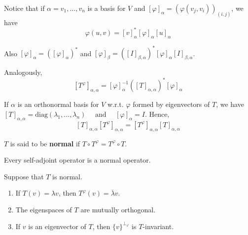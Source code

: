 Notice that if $\alpha = v_1, \ldots, v_n$ is a basis for $V$ and $[\varphi]_\alpha = (\varphi(v_j, v_i))_{(i,j)}$, we have 
\[
	\varphi(u,v) = [v]_\alpha^\ast [\varphi]_\alpha [u]_\alpha 
\]

Also $[\varphi]_\alpha = ([\varphi]_\alpha)^\ast$ and $[\varphi]_\beta = ([I]_{\beta, \alpha})^\ast [\varphi]_\alpha [I]_{\beta, \alpha}$.

Analogously,
\[ [T^\varphi]_{\alpha, \alpha} = [\varphi]_\alpha^{-1} ([T]_{\alpha, \alpha})^\ast [\varphi]_\alpha \]

If $\alpha$ is an orthonormal basis for $V$ w.r.t. $\varphi$ formed by eigenvectors of $T$, we have $[T]_{\alpha, \alpha} = \text{diag}(\lambda_1, \ldots, \lambda_n) \quad \text{ and } \quad [\varphi]_\alpha = I$. Hence, 
\[
  [T]_{\alpha, \alpha} [T^\varphi]_{\alpha, \alpha} = [T^\varphi]_{\alpha, \alpha} [T]_{\alpha, \alpha}
\]

\begin{definition}
  $T$ is said to be \textbf{normal} if $T \circ T^\varphi = T^\varphi \circ T$.
\end{definition}

Every self-adjoint operator is a normal operator. 

\begin{lemma}\label{lm:202301051341}
  Suppose that $T$ is normal.
  \begin{enumerate}
    \item If $T(v) = \lambda v$, then $T^\varphi(v) = \overline{\lambda} v$. 
    \item The eigenspaces of $T$ are mutually orthogonal. 
    \item If $v$ is an eigenvector of $T$, then $\{ v \}^{\perp_\varphi}$ is $T$-invariant. 
  \end{enumerate}
\end{lemma}

